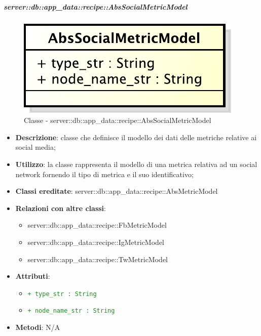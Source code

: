 		\subparagraph{server::db::app\_data::recipe::AbsSocialMetricModel} %
		\label{subp:server_db_app_data_recipe_abssocialmetricmodel}
			\begin{figure}[htbp]
				\centering
				\centerline{\includegraphics[scale=0.75]{./images/server/classes/db/abs_social_metric_model.pdf}}
				\caption{Classe - server::db::app\_data::recipe::AbsSocialMetricModel}
			\end{figure}
			\begin{itemize}
				\item \textbf{Descrizione}: classe che definisce il modello dei dati delle metriche relative ai social media;
				\item \textbf{Utilizzo}: la classe rappresenta il modello di una metrica relativa ad un social network fornendo il tipo di metrica e il suo identificativo;
				\item \textbf{Classi ereditate}: server::db::app\_data::recipe::AbsMetricModel
				\item \textbf{Relazioni con altre classi}:
					\begin{itemize}
						\item server::db::app\_data::recipe::FbMetricModel
						\item server::db::app\_data::recipe::IgMetricModel
						\item server::db::app\_data::recipe::TwMetricModel
					\end{itemize}
				\item \textbf{Attributi}:
					\begin{itemize}
						\item \textcolor{forestgreen}{\texttt{+ type\_str : String}}
						\item \textcolor{forestgreen}{\texttt{+ node\_name\_str : String}}
					\end{itemize}
				\item \textbf{Metodi}: N/A
			\end{itemize}


